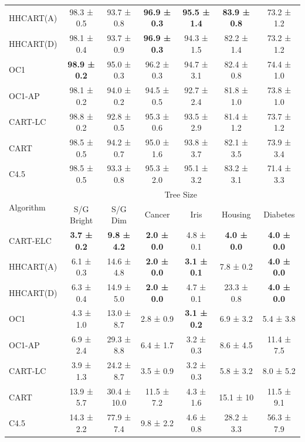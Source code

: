\documentclass[10pt]{article} %
\begin{document}
\begin{table}[h]
\begin{tabular}{lcccccc}
		HHCART(A) & 98.3 ± 0.5 & 93.7 ± 0.8 & \textbf{96.9 ± 0.3} &  \textbf{95.5 ± 1.4} &  \textbf{83.9 ± 0.8} & 73.2 ± 1.2  \\
		HHCART(D) & 98.1 ± 0.4 & 93.7 ± 0.9 & \textbf{96.9 ± 0.3} &  94.3 ± 1.5 &  82.2 ± 1.4 & 73.2 ± 1.2  \\
		OC1       & \textbf{98.9 ± 0.2} & 95.0 ± 0.3 & 96.2 ± 0.3 & 94.7 ± 3.1 & 82.4 ± 0.8 & 74.4 ± 1.0  \\
		OC1-AP    & 98.1 ± 0.2 & 94.0 ± 0.2 & 94.5 ± 0.5 & 92.7 ± 2.4 & 81.8 ± 1.0 & 73.8 ± 1.0  \\
		CART-LC   & 98.8 ± 0.2 & 92.8 ± 0.5 & 95.3 ± 0.6 & 93.5 ± 2.9 & 81.4 ± 1.2 & 73.7 ± 1.2  \\
		CART   & 98.5 ± 0.5 & 94.2 ± 0.7 & 95.0 ± 1.6 & 93.8 ± 3.7 & 82.1 ± 3.5 & 73.9 ± 3.4  \\
		C4.5      & 98.5 ± 0.5 & 93.3 ± 0.8 & 95.3 ± 2.0 & 95.1 ± 3.2 & 83.2 ± 3.1 & 71.4 ± 3.3  \\ 
		\midrule
		\multirow{2}{*}{Algorithm} & \multicolumn{6}{c}{Tree Size}  \\ 
		\cmidrule(lr){2-7}  
		& S/G Bright & S/G Dim & Cancer & Iris & Housing & Diabetes \\ 
		\midrule
		CART-ELC  & \textbf{3.7 ± 0.2}  & \textbf{9.8 ± 4.2}  & \textbf{2.0 ± 0.0}  & 4.8 ± 0.1  & \textbf{4.0 ± 0.0}  & \textbf{4.0 ± 0.0}  \\
		HHCART(A) & 6.1 ± 0.3  & 14.6 ± 4.8  & \textbf{2.0 ± 0.0}  & \textbf{3.1 ± 0.1}  & 7.8 ± 0.2  & \textbf{4.0 ± 0.0}  \\
		HHCART(D) & 6.3 ± 0.4  & 14.9 ± 5.0  & \textbf{2.0 ± 0.0}  & 4.7 ± 0.1  & 23.3 ± 0.8  & \textbf{4.0 ± 0.0}  \\
		OC1       & 4.3 ± 1.0  & 13.0 ± 8.7  & 2.8 ± 0.9  & \textbf{3.1 ± 0.2}  & 6.9 ± 3.2  & 5.4 ± 3.8  \\
		OC1-AP    & 6.9 ± 2.4  & 29.3 ± 8.8  & 6.4 ± 1.7  & 3.2 ± 0.3  & 8.6 ± 4.5  & 11.4 ± 7.5  \\
		CART-LC   & 3.9 ± 1.3  & 24.2 ± 8.7  & 3.5 ± 0.9  & 3.2 ± 0.3  & 5.8 ± 3.2  & 8.0 ± 5.2  \\
		CART   & 13.9 ± 5.7  & 30.4 ± 10.0  & 11.5 ± 7.2  & 4.3 ± 1.6  & 15.1 ± 10  & 11.5 ± 9.1  \\
		C4.5      & 14.3 ± 2.2  & 77.9 ± 7.4  & 9.8 ± 2.2  & 4.6 ± 0.8  & 28.2 ± 3.3  & 56.3 ± 7.9  \\ 
		\bottomrule
	\end{tabular}
	\label{fig:results}
\end{table}
\end{document}
